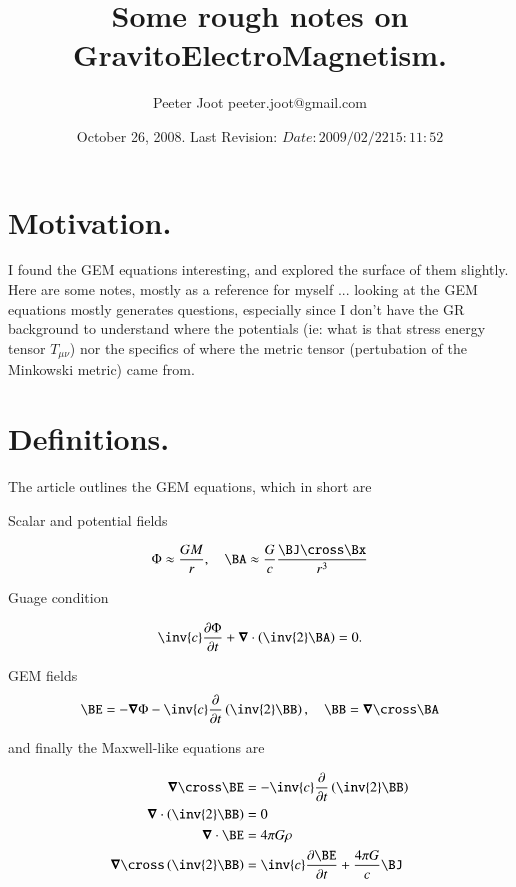\documentclass{article}
\title{ Some rough notes on GravitoElectroMagnetism. }
\author{Peeter Joot \quad peeter.joot@gmail.com}
\date{ October 26, 2008.  Last Revision: $Date: 2009/02/22 15:11:52 $ }
\begin{document}
\maketitle{}
\tableofcontents

\section{ Motivation. }

I found the GEM equations interesting, and explored the surface of them slightly.  Here are some notes, mostly as a reference for myself ... looking at the
GEM equations mostly generates questions, especially since I don't have the GR
background to understand where the potentials (ie: what is that stress energy
tensor $T_{\mu\nu}$) nor the specifics of where the metric tensor 
(pertubation of the Minkowski metric) came from.

\section{ Definitions. }

The article \cite{mashhoon2003gbr} outlines the GEM equations, which in short
are

Scalar and potential fields

\begin{align}
\Phi \approx \frac{GM}{r}, \quad \BA \approx \frac{G}{c} \frac{\BJ \cross \Bx}{r^3}
\end{align}

Guage condition

\begin{align}
\inv{c}\PD{t}{\Phi} + \spacegrad \cdot \left( \inv{2} \BA \right) = 0.
\end{align}

GEM fields
\begin{align}
\BE = - \spacegrad \Phi -\inv{c} \PD{t}{}\left( \inv{2} \BB \right), \quad \BB = \spacegrad \cross \BA
\end{align}

and finally the Maxwell-like equations are

\begin{align}
\spacegrad \cross \BE &= -\inv{c} \PD{t}{}\left(\inv{2}\BB\right) \\
\spacegrad \cdot \left( \inv{2} \BB \right) &= 0 \\
\spacegrad \cdot \BE &= 4 \pi G \rho \\
\spacegrad \cross \left( \inv{2} \BB \right) &= \inv{c} \PD{t}{\BE} + \frac{4\pi G}{c}\BJ
\end{align}
\end{document}
